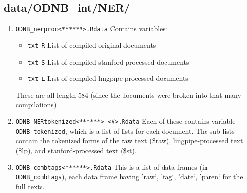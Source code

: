 \documentclass[11pt]{article}
\newcommand{\filename}[1]{\texttt{#1}}
\begin{document}
\subsection{data/ODNB\_int/NER/}
\begin{enumerate}
\item \filename{ODNB\_nerproc<******>.Rdata}
Contains variables: 
\begin{itemize}
\item \texttt{txt\_R} List of compiled original documents
\item \texttt{txt\_S} List of compiled stanford-processed documents
\item \texttt{txt\_L} List of compiled lingpipe-processed documents
\end{itemize}
These are all length 584 (since the documents were broken into that many compilations)

\item \filename{ODNB\_NERtokenized<******>\_<\#>.Rdata}
Each of these contains variable \texttt{ODNB\_tokenized}, which is a list of lists for each document. The sub-lists contain the tokenized forms of the raw text (\$raw), lingpipe-processed text (\$lp), and stanford-processed text (\$st).  

\item \filename{ODNB\_combtags<******>.Rdata}
This is a list of data frames (in \texttt{ODNB\_combtags}), each data frame having 'raw`, 'tag`, 'date`, 'paren` for the full texts. 
\end{enumerate}
\end{document}
